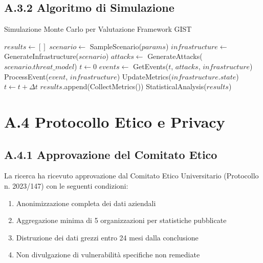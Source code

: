 \subsection{\texorpdfstring{\textbf{A.3.2 Algoritmo di Simulazione}}{A.3.2 - Algoritmo di Simulazione}}

\begin{algorithm}
\caption{Simulazione Monte Carlo per Valutazione Framework GIST}
\begin{algorithmic}[1]
    \State $results \gets []$
        \State $scenario \gets$ SampleScenario($params$)
        \State $infrastructure \gets$ GenerateInfrastructure($scenario$)
        \State $attacks \gets$ GenerateAttacks($scenario.threat\_model$)
        \State $t \gets 0$
            \State $events \gets$ GetEvents($t$, $attacks$, $infrastructure$)
                \State ProcessEvent($event$, $infrastructure$)
                \State UpdateMetrics($infrastructure.state$)
            \EndFor
            \State $t \gets t + \Delta t$
        \EndWhile
        \State $results$.append(CollectMetrics())
    \EndFor
    \State \Return StatisticalAnalysis($results$)
\EndProcedure
\end{algorithmic}
\end{algorithm}

\section{\texorpdfstring{\textbf{A.4 Protocollo Etico e Privacy}}{A.4 - Protocollo Etico e Privacy}}

\subsection{\texorpdfstring{\textbf{A.4.1 Approvazione del Comitato Etico}}{A.4.1 - Approvazione del Comitato Etico}}

La ricerca ha ricevuto approvazione dal Comitato Etico Universitario (Protocollo n. 2023/147) con le seguenti condizioni:

\begin{enumerate}
    \item Anonimizzazione completa dei dati aziendali
    \item Aggregazione minima di 5 organizzazioni per statistiche pubblicate
    \item Distruzione dei dati grezzi entro 24 mesi dalla conclusione
    \item Non divulgazione di vulnerabilità specifiche non remediate
\end{enumerate}

